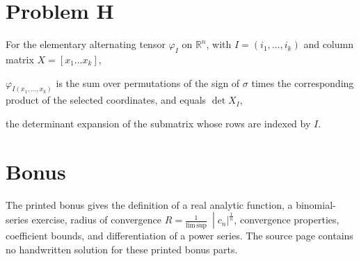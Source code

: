 \section{Problem H}

For the elementary alternating tensor \(\varphi_{I}\) on \(\mathbb{R}^{n}\), with \(I = \left( {i_{1},\ldots,i_{k}} \right)\) and column matrix \(X = \left\lbrack {x_{1}\ldots x_{k}} \right\rbrack\),

\(\varphi_{I{({x_{1},\ldots,x_{k}})}}\) is the sum over permutations of the sign of \(\sigma\) times the corresponding product of the selected coordinates, and equals \(\det X_{I}\),

the determinant expansion of the submatrix whose rows are indexed by \(I\).

\section{Bonus}

The printed bonus gives the definition of a real analytic function, a binomial-series exercise, radius of convergence \(\left. R = \frac{1}{\operatorname{lim\, sup}}\  \middle| c_{n}|^{\frac{1}{n}} \right.\), convergence properties, coefficient bounds, and differentiation of a power series. The source page contains no handwritten solution for these printed bonus parts.
